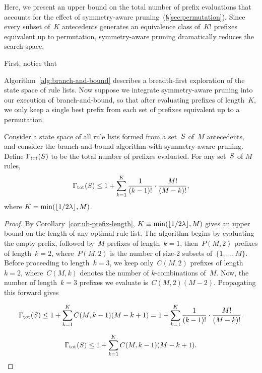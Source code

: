 Here, we present an upper bound on the total number of prefix
evaluations that accounts for the effect of symmetry-aware
pruning~(\S\ref{sec:permutation}).
%
Since every subset of~$K$ antecedents generates an equivalence
class of~$K!$ prefixes equivalent up to permutation, symmetry-aware
pruning dramatically reduces the search space.

\begin{arxiv}
First, notice that
\end{arxiv}
Algorithm~\ref{alg:branch-and-bound} describes a
breadth-first exploration of the state space of rule lists.
%
Now suppose we integrate symmetry-aware pruning into
our execution of branch-and-bound, so that after evaluating
prefixes of length~$K$, we only keep a single best prefix
from each set of prefixes equivalent up to a permutation.

\begin{theorem}
%
Consider a state space of all rule lists formed from a set~$S$
of~$M$ antecedents, and consider the branch-and-bound algorithm with
symmetry-aware pruning.
%
Define ${\Gamma_{\textnormal{tot}}}(S)$ to be the total number of prefixes evaluated.
%
For any set~$S$ of $M$ rules,
\begin{align}
{\Gamma_{\textnormal{tot}}}(S)
\le  1 + \sum_{k=1}^K \frac{1}{(k - 1)!} \cdot \frac{M!}{(M - k)!},
\end{align}
where ${K = \min(\lfloor 1 / 2 {\lambda} \rfloor, M)}$.
\end{theorem}

\begin{proof}
By Corollary~\ref{cor:ub-prefix-length},
${K \equiv \min(\lfloor 1 / 2 {\lambda} \rfloor, M)}$
gives an upper bound on the length of any optimal rule list.
%
The algorithm begins by evaluating the empty prefix,
followed by~$M$ prefixes of length~${k=1}$,
then~${P(M, 2)}$ prefixes of length~${k=2}$,
where~${P(M, 2)}$ is the number of size-2 subsets of~$\{1, \dots, M \}$.
%
Before proceeding to length~${k=3}$, we keep only~${C(M, 2)}$
prefixes of length~${k=2}$, where~${C(M, k)}$ denotes the
number of $k$-combinations of~$M$.
%
Now, the number of length~${k=3}$ prefixes we evaluate is~${C(M, 2) (M - 2)}$.
%
Propagating this forward gives
\begin{arxiv}
\begin{align}
{\Gamma_{\textnormal{tot}}}(S) \le 1 + \sum_{k=1}^K C(M, k-1) (M - k + 1)
= 1 + \sum_{k=1}^K \frac{1}{(k - 1)!} \cdot \frac{M!}{(M - k)!}.
\end{align}
\end{arxiv}
\begin{align}
{\Gamma_{\textnormal{tot}}}(S) \le 1 + \sum_{k=1}^K C(M, k-1) (M - k + 1).
\end{align}
\end{proof}

